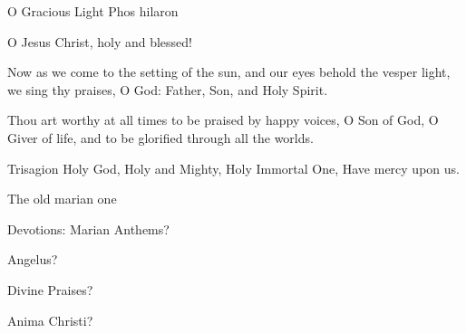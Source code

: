 \bigskip
O Gracious Light Phos hilaron
{\obeylines
{}
O Jesus Christ, holy and blessed!

\medskip
Now as we come to the setting of the sun,
and our eyes behold the vesper light,
we sing thy praises, O God: Father, Son, and Holy Spirit.

\medskip
Thou art worthy at all times to be praised by happy voices,
O Son of God, O Giver of life,
and to be glorified through all the worlds.
}
\bigskip
Trisagion
{\obeylines
Holy God,
Holy and Mighty,
Holy Immortal One,
Have mercy upon us.
}

The old marian one

Devotions:
Marian Anthems?

Angelus?

Divine Praises?

Anima Christi?
